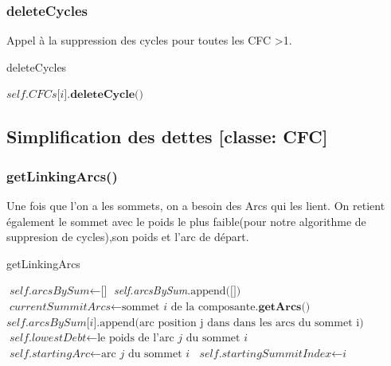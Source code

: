 \documentclass[a4paper]{article}
\begin{document}
\subsubsection{deleteCycles}
Appel à la suppression des cycles pour toutes les CFC >1.
\begin{algorithm}
\caption{deleteCycles}\label{delete}
\begin{algorithmic}[1]
\State $\textit{self.CFCs}\text{[}\textit{i}\text{]}\textbf{.deleteCycle()}$
\EndFor
\EndProcedure
\end{algorithmic}
\end{algorithm}
\subsection{Simplification des dettes [classe: CFC]}
\subsubsection{getLinkingArcs()}
Une fois que l'on a les sommets, on a besoin des Arcs qui les lient. On retient également le  sommet avec le poids le plus faible(pour notre algorithme de suppresion de cycles),son poids et l'arc de départ. 
\begin{algorithm}[H]
\caption{getLinkingArcs}\label{Link}
\begin{algorithmic}[1]
\State $\textit{self.arcsBySum}\gets \text{[]}$
\State \textit{self.arcsBySum}$\text{.append([])}$
\State $\textit{currentSummitArcs}\gets \text{sommet}\textit{ i }\text{de la composante}\textbf{.getArcs()}$
\State $\textit{self.arcsBySum[i]}\text{.append(arc position j dans dans les arcs du sommet i)}$
\State $\textit{self.lowestDebt} \gets \text{le poids de l'arc } \textit{j}\text{ du sommet }\textit{i}$
\State $\textit{self.startingArc}\gets \text{arc }\textit{j} \text{ du sommet }\textit{i}$
\State $\textit{self.startingSummitIndex}\gets\textit{i}$
\EndIf
\EndIf
\EndFor
\EndFor
\EndProcedure
\end{algorithmic}
\end{algorithm}
\end{document}
